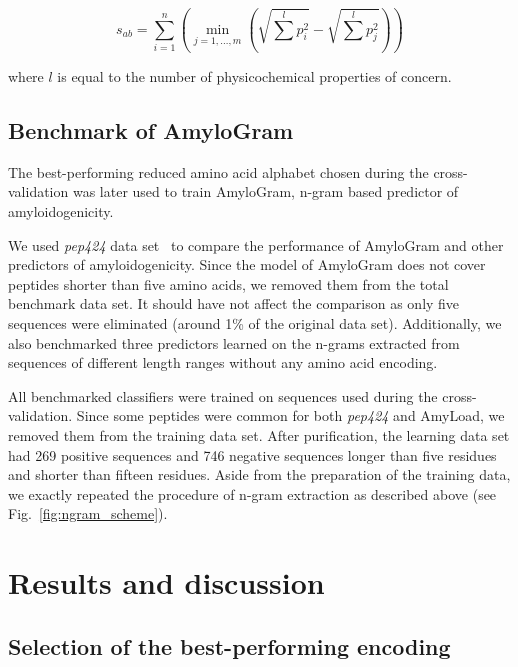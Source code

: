 \documentclass[a4,center,fleqn]{NAR}
\begin{document}
$$
s_{ab} = \sum^n_{i = 1}  \left( \min_{j=1,\dots,m} \left(\sqrt{\sum^l p_{i}^2} 
- \sqrt{\sum^l p_{j}^2} \right) \right)
$$
 
where $l$ is equal to the number of physicochemical properties of concern.

\subsection{Benchmark of AmyloGram}

The best-performing reduced amino acid alphabet chosen during the 
cross-validation was later used to train AmyloGram, n-gram based predictor of 
amyloidogenicity.

  We used \textit{pep424} data set~\citep{walsh_pasta_2014} to compare the 
performance of AmyloGram and other predictors of amyloidogenicity. Since the 
model of AmyloGram does not cover peptides shorter than five amino acids, we 
removed them from the total benchmark data set. It should have not affect the 
comparison as only five sequences were eliminated (around 1\% of the original 
data set). Additionally, we also benchmarked three predictors learned on the 
n-grams extracted from sequences of different length ranges without any amino 
acid encoding.

  All benchmarked classifiers were trained on sequences used during the 
cross-validation. Since some peptides were common for both \textit{pep424} and 
AmyLoad, we removed them from the training data set. After purification, the 
learning data set had 269 positive sequences and 746 negative sequences longer 
than five residues and shorter than fifteen residues. Aside from the 
preparation of the training data, we exactly repeated the procedure of n-gram 
extraction as described above (see Fig.~\ref{fig:ngram_scheme}). 


\section{Results and discussion}

\subsection{Selection of the best-performing encoding}
\end{document}
